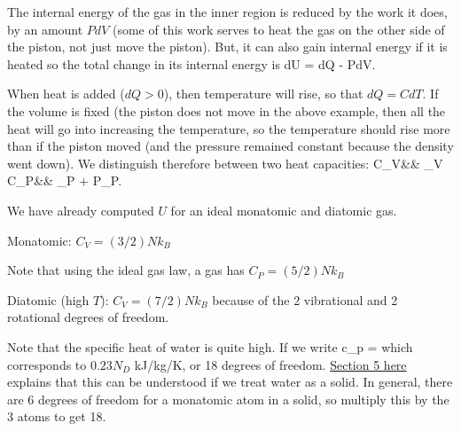 \documentclass[11pt]{book}
\begin{document}
The internal energy of the gas in the inner region is reduced by the work it does, by an amount $PdV$ (some of this work serves to heat the gas on the other side of the piston, not just move the piston). But, it can also gain internal energy if it is heated so the total change in its internal energy is
\be
dU = dQ - PdV.\ee

When heat is added ($dQ>0$), then temperature will rise, so that $dQ=CdT$. If the volume is fixed (the piston does not move in the above example, then all the heat will go into increasing the temperature, so the temperature should rise more than if the piston moved (and the pressure remained constant because the density went down). We distinguish therefore between two heat capacities:
\bea
C_V&\equiv& \Big\vert_V
\vs
C_P&\equiv& \Big\vert_P + P\Big\vert_P.
\eea

We have already computed $U$ for an ideal monatomic and diatomic gas. 
\bei
\item Monatomic: $C_V = (3/2) Nk_B$
\item Note that using the ideal gas law, a gas has $C_P=(5/2)Nk_B$
\item Diatomic (high $T$): $C_V=(7/2) N k_B$ because of the 2 vibrational and 2 rotational degrees of freedom.
\eei


Note that the specific heat of water is quite high. If we write
\be
c_p = \ee
which corresponds to $0.23 N_D$ kJ/kg/K, or 18 degrees of freedom. \href{http://galileo.phys.virginia.edu/classes/304/h2o.pdf}{Section 5 here} explains that this can be understood if we treat water as a solid. In general, there are 6 degrees of freedom for a monatomic atom in a solid, so multiply this by the 3 atoms to get 18. 

 
\end{document}
